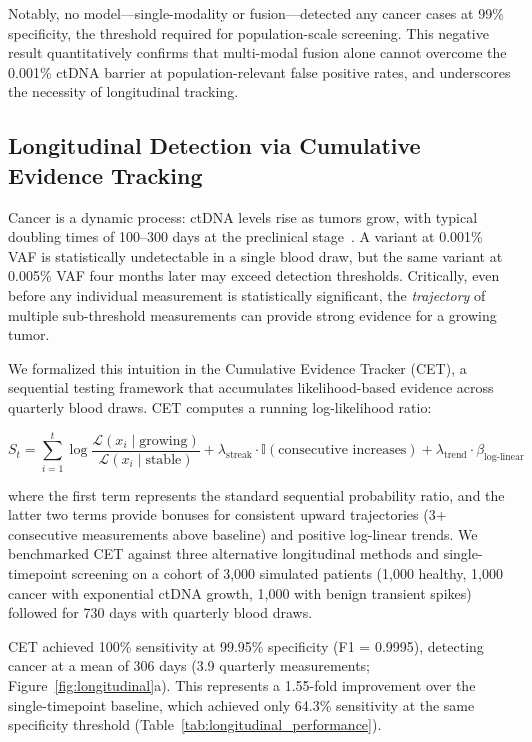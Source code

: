 \documentclass[10pt,a4paper]{article}
\begin{document}
Notably, no model—single-modality or fusion—detected any cancer cases at 99\% specificity, the threshold required for population-scale screening. This negative result quantitatively confirms that multi-modal fusion alone cannot overcome the 0.001\% ctDNA barrier at population-relevant false positive rates, and underscores the necessity of longitudinal tracking.

\subsection{Longitudinal Detection via Cumulative Evidence Tracking}

Cancer is a dynamic process: ctDNA levels rise as tumors grow, with typical doubling times of 100--300 days at the preclinical stage~\citet{avanzini2020mathematical}. A variant at 0.001\% VAF is statistically undetectable in a single blood draw, but the same variant at 0.005\% VAF four months later may exceed detection thresholds. Critically, even before any individual measurement is statistically significant, the \textit{trajectory} of multiple sub-threshold measurements can provide strong evidence for a growing tumor.

We formalized this intuition in the Cumulative Evidence Tracker (CET), a sequential testing framework that accumulates likelihood-based evidence across quarterly blood draws. CET computes a running log-likelihood ratio:

\begin{equation}
S_t = \sum_{i=1}^{t} \log \frac{\mathcal{L}(x_i \mid \text{growing})}{\mathcal{L}(x_i \mid \text{stable})} + \lambda_{\text{streak}} \cdot \mathbb{I}(\text{consecutive increases}) + \lambda_{\text{trend}} \cdot \beta_{\text{log-linear}}
\end{equation}

where the first term represents the standard sequential probability ratio, and the latter two terms provide bonuses for consistent upward trajectories (3+ consecutive measurements above baseline) and positive log-linear trends. We benchmarked CET against three alternative longitudinal methods and single-timepoint screening on a cohort of 3,000 simulated patients (1,000 healthy, 1,000 cancer with exponential ctDNA growth, 1,000 with benign transient spikes) followed for 730 days with quarterly blood draws.

CET achieved 100\% sensitivity at 99.95\% specificity (F1 = 0.9995), detecting cancer at a mean of 306 days (3.9 quarterly measurements; Figure~\ref{fig:longitudinal}a). This represents a 1.55-fold improvement over the single-timepoint baseline, which achieved only 64.3\% sensitivity at the same specificity threshold (Table~\ref{tab:longitudinal_performance}).
\end{document}
